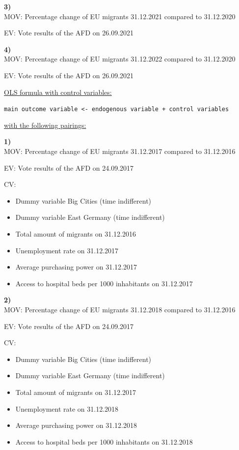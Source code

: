 \documentclass[
  letterpaper,
  DIV=11,
  numbers=noendperiod]{scrartcl}
\begin{document}
\textbf{3)}\\
MOV: Percentage change of EU migrants 31.12.2021 compared to 31.12.2020

EV: Vote results of the AFD on 26.09.2021

\textbf{4)}\\
MOV: Percentage change of EU migrants 31.12.2022 compared to 31.12.2020

EV: Vote results of the AFD on 26.09.2021

\ul{OLS formula with control variables:}

\texttt{main\ outcome\ variable\ \textless{}-\ endogenous\ variable\ +\ control\ variables}

\ul{with the following pairings:}

\textbf{1)}\\
MOV: Percentage change of EU migrants 31.12.2017 compared to 31.12.2016

EV: Vote results of the AFD on 24.09.2017

CV:

\begin{itemize}
\item
  Dummy variable Big Cities (time indifferent)
\item
  Dummy variable East Germany (time indifferent)
\item
  Total amount of migrants on 31.12.2016
\item
  Unemployment rate on 31.12.2017
\item
  Average purchasing power on 31.12.2017
\item
  Access to hospital beds per 1000 inhabitants on 31.12.2017
\end{itemize}

\textbf{2)}\\
MOV: Percentage change of EU migrants 31.12.2018 compared to 31.12.2016

EV: Vote results of the AFD on 24.09.2017

CV:

\begin{itemize}
\item
  Dummy variable Big Cities (time indifferent)
\item
  Dummy variable East Germany (time indifferent)
\item
  Total amount of migrants on 31.12.2017
\item
  Unemployment rate on 31.12.2018
\item
  Average purchasing power on 31.12.2018
\item
  Access to hospital beds per 1000 inhabitants on 31.12.2018
\end{itemize}
\end{document}

